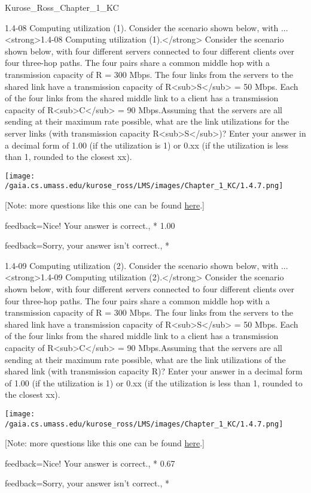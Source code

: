\documentclass[a4paper]{article}
\begin{document}
\begin{quiz}{Kurose_Ross_Chapter_1_KC}
\begin{shortanswer}[
	points=1,
	penalty=0.33333,
]{1.4-08 Computing utilization (1). Consider the scenario shown below, with ...}
<strong>1.4-08 Computing utilization (1).</strong> Consider the scenario shown below, with four different servers connected to four different clients over four three-hop paths. The four pairs share a common middle hop with a transmission capacity of R = 300 Mbps. The four links from the servers to the shared link have a transmission capacity of R<sub>S</sub> = 50 Mbps. Each of the four links from the shared middle link to a client has a transmission capacity of R<sub>C</sub> = 90 Mbps.Assuming that the servers are all sending at their maximum rate possible, what are the link utilizations for the server links (with transmission capacity R<sub>S</sub>)? Enter your answer in a decimal form of 1.00 (if the utilization is 1) or 0.xx (if the utilization is less than 1, rounded to the closest xx). 
\begin{center}
\texttt{[image: /gaia.cs.umass.edu/kurose\_ross/LMS/images/Chapter\_1\_KC/1.4.7.png]}
\end{center}
 [Note: more questions like this one can be found \href{http://gaia.cs.umass.edu/kurose_ross/interactive/end-end-throughput-simple.php}{here}.]
\item[feedback={Nice!  Your answer is correct.},]* 1.00
\item[feedback={Sorry, your answer isn't correct.},] *
\end{shortanswer}

\begin{shortanswer}[
	points=1,
	penalty=0.33333,
]{1.4-09 Computing utilization (2). Consider the scenario shown below, with ...}
<strong>1.4-09 Computing utilization (2).</strong> Consider the scenario shown below, with four different servers connected to four different clients over four three-hop paths. The four pairs share a common middle hop with a transmission capacity of R = 300 Mbps. The four links from the servers to the shared link have a transmission capacity of R<sub>S</sub> = 50 Mbps. Each of the four links from the shared middle link to a client has a transmission capacity of R<sub>C</sub> = 90 Mbps.Assuming that the servers are all sending at their maximum rate possible, what are the link utilizations of the shared link (with transmission capacity R)? Enter your answer in a decimal form of 1.00 (if the utilization is 1) or 0.xx (if the utilization is less than 1, rounded to the closest xx). 
\begin{center}
\texttt{[image: /gaia.cs.umass.edu/kurose\_ross/LMS/images/Chapter\_1\_KC/1.4.7.png]}
\end{center}
 [Note: more questions like this one can be found \href{http://gaia.cs.umass.edu/kurose_ross/interactive/end-end-throughput-simple.php}{here}.]
\item[feedback={Nice!  Your answer is correct.},]* 0.67
\item[feedback={Sorry, your answer isn't correct.},] *
\end{shortanswer}


\end{quiz}
\end{document}
